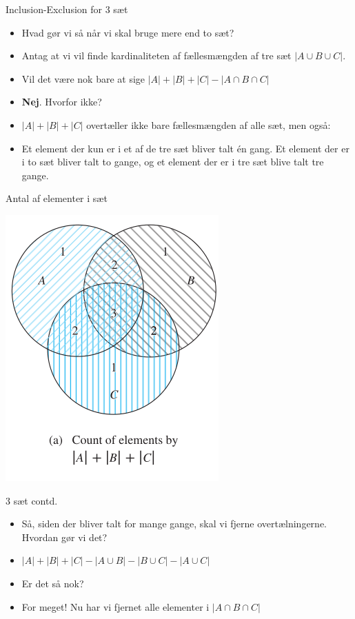 \documentclass{beamer}
\begin{document}
\begin{frame}{Inclusion-Exclusion for 3 sæt}
   \begin{itemize}
       \item<1-> Hvad gør vi så når vi skal bruge mere end to sæt? 
       \item<1-> Antag at vi vil finde kardinaliteten af fællesmængden af tre sæt $|A \cup B \cup C|$.
       \item<1-> Vil det være nok bare at sige $|A| + |B| + |C| - |A \cap B \cap C|$
       \item<2-> \textbf{Nej}. Hvorfor ikke?
       \item<3-> $|A| + |B| + |C|$ overtæller ikke bare fællesmængden af alle sæt, men også:
       \item<3-> Et element der kun er i et af de tre sæt bliver talt én gang. Et element der er i to sæt bliver talt to gange, og et element der er i tre sæt blive talt tre gange. 
   \end{itemize} 
\end{frame}

\begin{frame}{Antal af elementer i sæt}
\begin{center}
    
    \includegraphics[scale=0.8]{81fig3a.png}
\end{center}
\end{frame}

\begin{frame}{3 sæt contd. }
   \begin{itemize}
       \item<1-> Så, siden der bliver talt for mange gange, skal vi fjerne overtælningerne. Hvordan gør vi det? 
       \item<2-> $|A|+|B|+|C| - |A \cup B| - |B \cup C| - |A \cup C|$
       \item<2-> Er det så nok? 
       \item<3-> For meget! Nu har vi fjernet alle elementer i $|A \cap B \cap C|$
   \end{itemize} 
\end{frame}
\end{document}
